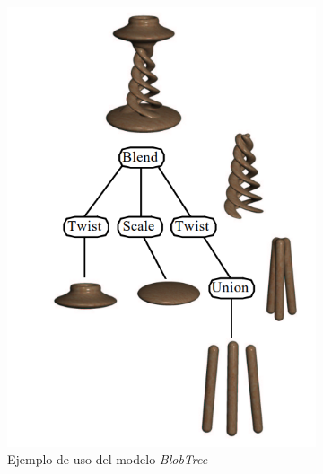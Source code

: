 \begin{figure}[!h]
    \centering
    \begin{subfigure}[b]{0.45\textwidth}
        \centering
        \includegraphics[width=\textwidth]{Plantilla-TFG-master/img/blobtree.png}
        \caption{Ejemplo de uso del modelo \textit{BlobTree} \cite{blinn1982generalization} }
    \end{subfigure}
    \hspace{15pt}
    \begin{subfigure}[b]{0.45\textwidth}
        \centering

\end{subfigure}
\end{figure}
